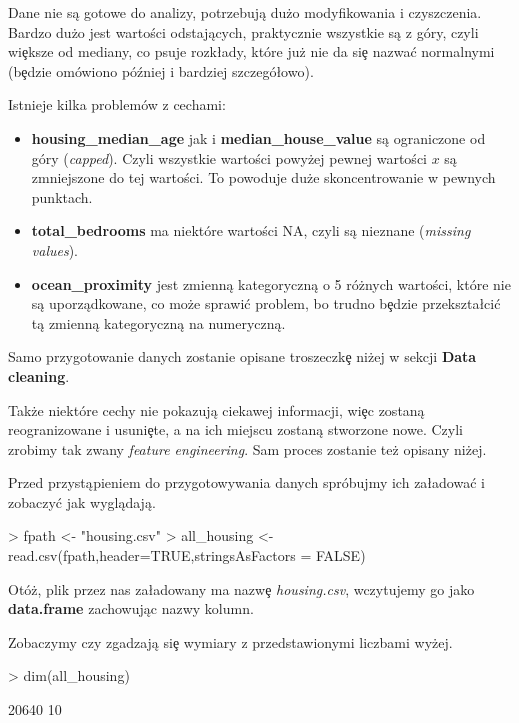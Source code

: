 \documentclass{article}
\begin{document}
\noindent
\quad Dane nie są gotowe do analizy, potrzebują dużo modyfikowania i czyszczenia. Bardzo dużo jest wartości odstających, praktycznie wszystkie są z góry, czyli wi\c eksze od mediany, co psuje rozk\l ady, które już nie da si\c e nazwa\'c normalnymi (b\c edzie omówiono później i bardziej szczegó\l owo). 

\noindent
\quad Istnieje kilka problemów z cechami:

\begin{itemize}
  \item \textbf{housing\_median\_age} jak i \textbf{median\_house\_value} są ograniczone od góry (\textit{capped}). Czyli wszystkie wartości powyżej pewnej wartości $x$ są zmniejszone do tej wartości. To powoduje duże skoncentrowanie w pewnych punktach.
  \item \textbf{total\_bedrooms} ma niektóre wartości NA, czyli są nieznane (\textit{missing values}).
  \item \textbf{ocean\_proximity} jest zmienną kategoryczną o 5 różnych wartości, które nie są uporządkowane, co może sprawi\'c problem, bo trudno b\c edzie przekszta\l ci\'c tą zmienną kategoryczną na numeryczną.
\end{itemize}

\noindent
\quad Samo przygotowanie danych zostanie opisane troszeczk\c e niżej w sekcji \textbf{Data cleaning}.

\noindent
\quad Także niektóre cechy nie pokazują ciekawej informacji, wi\c ec zostaną reogranizowane i usuni\c ete, a na ich miejscu zostaną stworzone nowe. Czyli zrobimy tak zwany \textit{feature engineering}. Sam proces zostanie też opisany niżej.

\noindent
\quad Przed przystąpieniem do przygotowywania danych spróbujmy ich za\l adowa\'c i zobaczy\'c jak wyglądają.


\begin{Schunk}
\begin{Sinput}
> fpath <- "housing.csv"
> all_housing <- read.csv(fpath,header=TRUE,stringsAsFactors = FALSE)
\end{Sinput}
\end{Schunk}

\noindent
\quad Otóż, plik przez nas za\l adowany ma nazw\c e \textit{housing.csv}, wczytujemy go jako \textbf{data.frame} zachowując nazwy kolumn.

\noindent
\quad Zobaczymy czy zgadzają si\c e wymiary z przedstawionymi liczbami wyżej.

\begin{Schunk}
\begin{Sinput}
> dim(all_housing)
\end{Sinput}
\begin{Soutput}
[1] 20640    10
\end{Soutput}
\end{Schunk}
\end{document}
